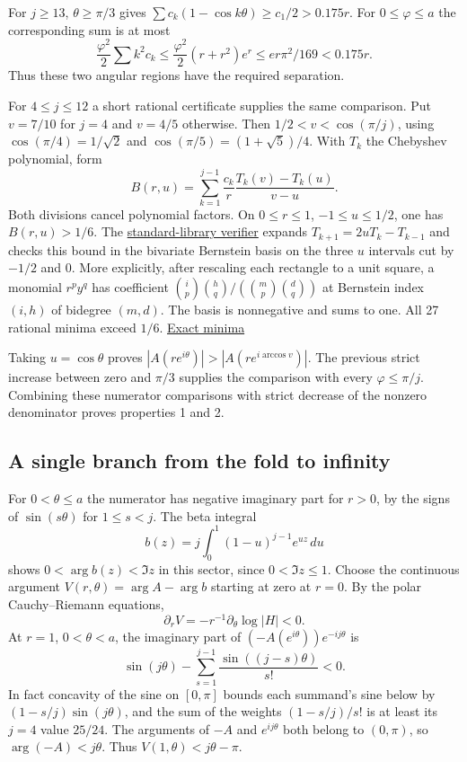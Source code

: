 \documentclass[11pt]{article}
\begin{document}
For $j\ge13$, $\theta\ge\pi/3$ gives $\sum c_k(1-\cos k\theta)\ge c_1/2>0.175r$. For $0\le\varphi\le a$ the corresponding sum is at most
\[
\frac{\varphi^2}2\sum k^2c_k\le \frac{\varphi^2}2(r+r^2)e^r
 \le er\pi^2/169 < 0.175r .
\]
Thus these two angular regions have the required separation.

For $4\le j\le12$ a short rational certificate supplies the same comparison. Put $v=7/10$ for $j=4$ and $v=4/5$ otherwise. Then $1/2<v<\cos(\pi/j)$, using $\cos(\pi/4)=1/\sqrt2$ and $\cos(\pi/5)=(1+\sqrt5)/4$. With $T_k$ the Chebyshev polynomial, form
\[
B(r,u)=\sum_{k=1}^{j-1}\frac{c_k}{r}\frac{T_k(v)-T_k(u)}{v-u}.
\]
Both divisions cancel polynomial factors. On $0\le r\le1$, $-1\le u\le1/2$, one has $B(r,u)>1/6$. The \href{https://github.com/ProgramComputer/open-math-research/blob/main/topics/ordered-large-blocks/code/verify_angular_modulus.py}{standard-library verifier} expands $T_{k+1}=2uT_k-T_{k-1}$ and checks this bound in the bivariate Bernstein basis on the three $u$ intervals cut by $-1/2$ and $0$. More explicitly, after rescaling each rectangle to a unit square, a monomial $r^p y^q$ has coefficient $\binom{i}{p}\binom{h}{q}/(\binom{m}{p}\binom{d}{q})$ at Bernstein index $(i,h)$ of bidegree $(m,d)$. The basis is nonnegative and sums to one. All 27 rational minima exceed $1/6$. \href{https://github.com/ProgramComputer/open-math-research/blob/main/topics/ordered-large-blocks/results/angular-modulus.json}{Exact minima}

Taking $u=\cos\theta$ proves $|A(re^{i\theta})|>|A(re^{i\arccos v})|$. The previous strict increase between zero and $\pi/3$ supplies the comparison with every $\varphi\le\pi/j$. Combining these numerator comparisons with strict decrease of the nonzero denominator proves properties 1 and 2.

\subsection{A single branch from the fold to infinity}

For $0<\theta\le a$ the numerator has negative imaginary part for $r>0$, by the signs of $\sin(s\theta)$ for $1\le s<j$. The beta integral
\[
b(z)=j\int_0^1 (1-u)^{j-1}e^{uz}\,du
\]
shows $0<\arg b(z)<\Im z$ in this sector, since $0<\Im z\le1$. Choose the continuous argument $V(r,\theta)=\arg A-\arg b$ starting at zero at $r=0$. By the polar Cauchy--Riemann equations,
\[
\partial_r V=-r^{-1}\partial_\theta\log |H|<0.
\]
At $r=1$, $0<\theta<a$, the imaginary part of $(-A(e^{i\theta}))e^{-ij\theta}$ is
\[
\sin(j\theta)-\sum_{s=1}^{j-1}\frac{\sin((j-s)\theta)}{s!}<0 .
\]
In fact concavity of the sine on $[0,\pi]$ bounds each summand's sine below by $(1-s/j)\sin(j\theta)$, and the sum of the weights $ (1-s/j)/s!$ is at least its $j=4$ value $25/24$. The arguments of $-A$ and $e^{ij\theta}$ both belong to $(0,\pi)$, so $\arg(-A)<j\theta$. Thus $V(1,\theta)<j\theta-\pi$.
\end{document}
